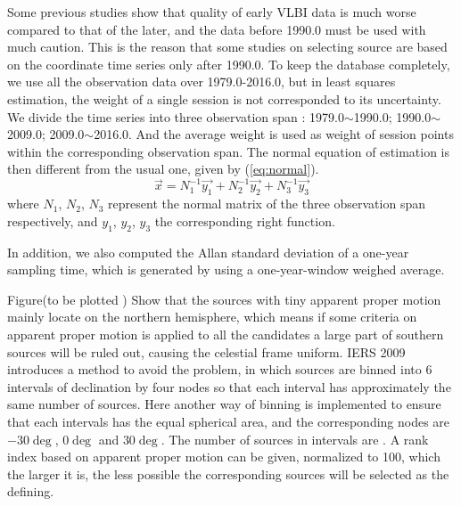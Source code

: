 \documentclass{aa}
\begin{document}
Some previous studies show that quality of early VLBI data is much worse compared to that of the later, and the data before 1990.0 must be used with much caution. This is the reason that some studies on selecting source are based on the coordinate time series only after 1990.0. To keep the database completely, we use all the observation data over 1979.0-2016.0, but in least squares estimation, the weight of a single session is not corresponded to its uncertainty. We divide the time series into three observation span : 1979.0$\sim$1990.0; 1990.0$\sim$2009.0; 2009.0$\sim$2016.0. And the average weight is used as weight of session points within the corresponding observation span. The normal equation of estimation is then different from the usual one, given by (\ref{eq:normal}).
\begin{equation}
\label{eq:normal}
\vec{x}  = N^{-1}_1 \vec{y_1} + N^{-1}_2 \vec{y_2} + N^{-1}_3 \vec{y_3}
\end{equation} 
where $N_1$, $N_2$, $N_3$ represent the normal matrix of the three observation span respectively, and  $y_1$, $y_2$, $y_3$ the corresponding right function.

In addition, we also computed the Allan standard deviation of a one-year sampling time, which is generated by using a one-year-window weighed average.

Figure(to be plotted ) Show that the sources with tiny apparent proper motion mainly locate on the northern hemisphere, which means if some criteria on apparent proper motion is applied to all the candidates a large part of southern sources will be ruled out, causing the celestial frame uniform. IERS 2009
introduces a method to avoid the problem, in which sources are binned into 6 intervals of declination by four nodes so that each interval has approximately the same number of sources. Here another way of binning is implemented to ensure that each intervals has  the equal spherical area, and the corresponding nodes are $-30\deg$, $0\deg$ and $30\deg$. 
The number of sources in intervals are .
A rank index based on apparent proper motion can be given, normalized to 100, which the larger it is, the less possible the corresponding sources will be selected as the defining. 
\end{document}
